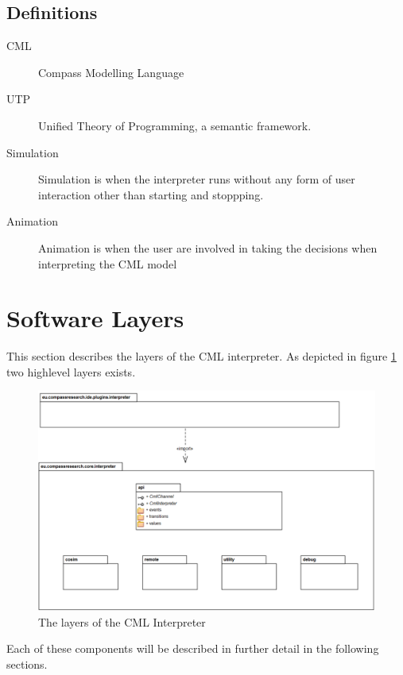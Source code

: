 \documentclass[a4paper, 10pt]{include/compassreport}   %
\begin{document}
\subsection{Definitions}
\begin{description}
\item[CML] Compass Modelling Language
\item[UTP] Unified Theory of Programming, a semantic framework.
\item[Simulation] Simulation is when the interpreter runs without
  any form of user interaction other than starting and stoppping.
\item[Animation] Animation is when the user are involved in taking
  the decisions when interpreting the CML model
\end{description}

\section{Software Layers}
\label{sec:software_layers}
This section describes the layers of the CML
interpreter. As depicted in figure \ref{fig:layers} two highlevel layers exists.

\begin{figure}[ht!]
  \begin{center}
    \includegraphics[width=1\textwidth]{figures/layers}
    \caption{The layers of the CML Interpreter}
    \label{fig:layers}
  \end{center}
\end{figure}

Each of these components will be described in further detail in the
following sections.
\end{document}
